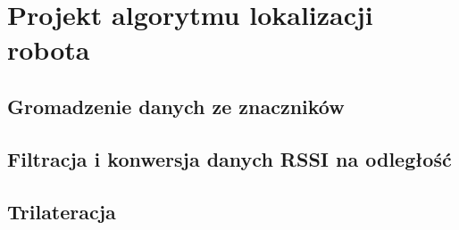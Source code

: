 \chapter{Projekt algorytmu lokalizacji robota}
\label{ch:nrf}

\section{Gromadzenie danych ze znaczników}

\section{Filtracja i konwersja danych RSSI na odległość}

\section{Trilateracja}


 
